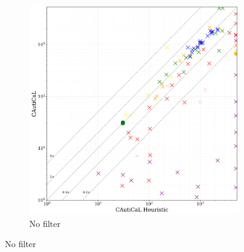 \begin{figure}[!t]
    \centering

    \begin{subfigure}[t]{0.3\textwidth}
        \centering
        \includegraphics[width=\textwidth]{figs/globaldontfilter_heuristic_comparison.jpg}
        \caption{No filter}
        \label{fig:globaldontfilter}
    \end{subfigure}



\end{figure}
